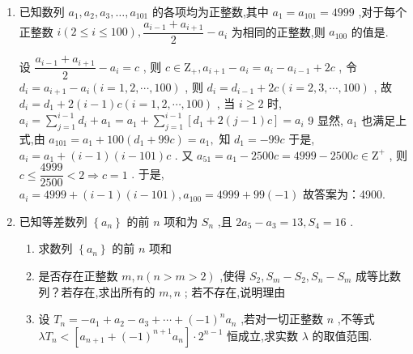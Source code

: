 \begin{enumerate}
    \item 已知数列 ${a}_{1},{a}_{2},{a}_{3},\ldots ,{a}_{101}$ 的各项均为正整数,其中 ${a}_{1} = {a}_{101} = {4999}$ ,对于每个正整数 $i\left( {2 \leq  i \leq  {100}}\right) ,\dfrac{{a}_{i - 1} + {a}_{i + 1}}{2} - {a}_{i}$ 为相同的正整数,则 ${a}_{100}$ 的值是.
    \begin{jieda}
        设 $\dfrac{{a}_{i - 1} + {a}_{i + 1}}{2} - {a}_{i} = c$ ,
        则 $c \in  {\mathrm{Z}}_{ + },{a}_{i + 1} - {a}_{i} = {a}_{i} - {a}_{i - 1} + {2c}$ ,
        令 ${d}_{i} = {a}_{i + 1} - {a}_{i}\left( {i = 1,2,\cdots ,{100}}\right)$ ,
        则 ${d}_{i} = {d}_{i - 1} + {2c}\left( {i = 2,3,\cdots ,{100}}\right)$ ,
        故 ${d}_{i} = {d}_{1} + 2\left( {i - 1}\right) c\left( {i = 1,2,\cdots ,{100}}\right)$ ,
        当 $i \geq  2$ 时,
        ${a}_{i} = \mathop{\sum }\limits_{{j = 1}}^{{i - 1}}{d}_{i} + {a}_{1} = {a}_{1} + \mathop{\sum }\limits_{{j = 1}}^{{i - 1}}\left\lbrack  {{d}_{1} + 2\left( {j - 1}\right) c}\right\rbrack   = {a}_{i}$
        9
        显然, ${a}_{1}$ 也满足上式,由
        ${a}_{101} = {a}_{1} + {100}\left( {{d}_{1} + {99c}}\right)  = {a}_{1},$
        知 ${d}_{1} =  - {99c}$
        于是, ${a}_{i} = {a}_{1} + \left( {i - 1}\right) \left( {i - {101}}\right) c$ .
        又 ${a}_{51} = {a}_{1} - {2500c} = {4999} - {2500c} \in  {\mathrm{Z}}^{ + }$ ,
        则 $c \leq  \dfrac{4999}{2500} < 2 \Rightarrow  c = 1$ .
        于是,
        ${a}_{i} = {4999} + \left( {i - 1}\right) \left( {i - {101}}\right) ,{a}_{100} = {4999} + {99}\left( {-1}\right)$
        故答案为：4900.
    \end{jieda}
    \item 已知等差数列 $\left\{  {a}_{n}\right\}$ 的前 $n$ 项和为 ${S}_{n}$ ,且 $2{a}_{5} - {a}_{3} = {13},{S}_{4} = {16}$ . 
    \begin{enumerate}
        \item 求数列 $\left\{  {a}_{n}\right\}$ 的前 $n$ 项和
        \item 是否存在正整数 $m,n\left( {n > m > 2}\right)$ ,使得 ${S}_{2},{S}_{m} - {S}_{2},{S}_{n} - {S}_{m}$ 成等比数列？若存在,求出所有的 $m,n$ ; 若不存在,说明理由
        \item 设 ${T}_{n} =  - {a}_{1} + {a}_{2} - {a}_{3} + \cdots  + {\left( -1\right) }^{n}{a}_{n}$ ,若对一切正整数 $n$ ,不等式 $\lambda {T}_{n} < \left\lbrack  {{a}_{n + 1} + {\left( -1\right) }^{n + 1}{a}_{n}}\right\rbrack   \cdot  {2}^{n - 1}$ 恒成立,求实数 $\lambda$ 的取值范围.
    \end{enumerate}

\end{enumerate}

